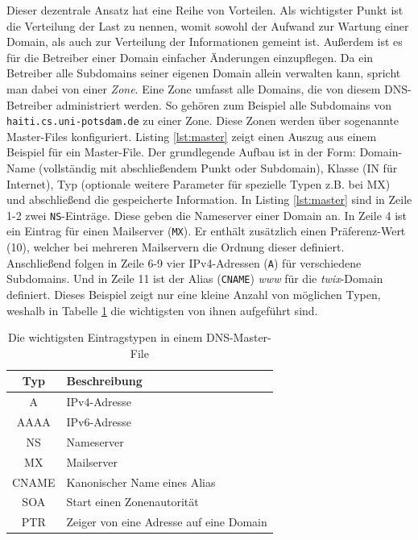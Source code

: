 \documentclass[a4paper, 12pt, BCOR10mm, DIV12, toc=bibliography, toc=listof, german]{scrbook}
\begin{document}
			

			Dieser dezentrale Ansatz hat eine Reihe von Vorteilen. Als wichtigster Punkt ist die
			Verteilung der Last zu nennen, womit sowohl der Aufwand zur Wartung einer Domain, als auch zur
			Verteilung der Informationen gemeint ist. Außerdem ist es für die Betreiber einer Domain
			einfacher Änderungen einzupflegen. Da ein Betreiber alle Subdomains seiner eigenen Domain
			allein verwalten kann, spricht man dabei von einer \textit{Zone}.
			Eine Zone umfasst alle Domains, die von diesem DNS-Betreiber administriert werden. So gehören
			zum Beispiel alle Subdomains von \texttt{haiti.cs.uni-potsdam.de} zu einer Zone. Diese Zonen
			werden über sogenannte Master-Files \cite{rfc1035,liualb2006} konfiguriert. Listing
			\ref{lst:master} zeigt einen Auszug aus einem Beispiel für ein Master-File. Der grundlegende
			Aufbau ist in der Form: Domain-Name (vollständig mit abschließendem Punkt oder Subdomain),
			Klasse (IN für Internet), Typ (optionale weitere Parameter für spezielle Typen z.B. bei MX)
			und abschließend die gespeicherte Information. In Listing \ref{lst:master} sind in Zeile 1-2
			zwei \texttt{NS}-Einträge. Diese geben die Nameserver einer Domain an. In Zeile 4 ist ein Eintrag
			für einen Mailserver (\texttt{MX}). Er enthält zusätzlich einen Präferenz-Wert (10),
			welcher bei mehreren Mailservern die Ordnung dieser definiert. Anschließend folgen in Zeile
			6-9 vier IPv4-Adressen (\texttt{A}) für verschiedene Subdomains. Und in Zeile 11 ist der Alias
			(\texttt{CNAME}) \textit{www} für die  \textit{twix}-Domain definiert. Dieses Beispiel zeigt
			nur eine kleine Anzahl von möglichen Typen, weshalb in Tabelle \ref{tab:dns-types} die
			wichtigsten von ihnen aufgeführt sind.

			\begin{table}
				\centering
				\begin{tabular}{|c|l|}\hline
					Typ & Beschreibung \\\hline\hline
					A	& IPv4-Adresse\\
					AAAA	& IPv6-Adresse\\
					NS	& Nameserver\\
					MX	& Mailserver\\
					CNAME	& Kanonischer Name eines Alias\\
					SOA	& Start einen Zonenautorität\\
					PTR		& Zeiger von eine Adresse auf eine Domain\\\hline
				\end{tabular}
			\caption{Die wichtigsten Eintragstypen in einem DNS-Master-File \cite{rfc1035,rfc3596}}
			\label{tab:dns-types}
			\end{table}
\end{document}
